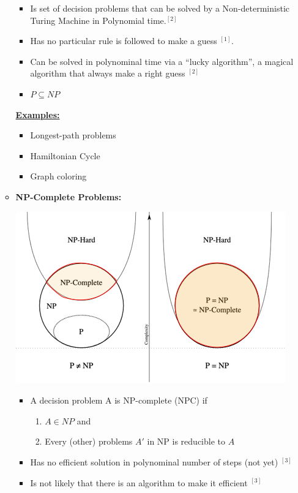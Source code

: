 \documentclass[12pt]{article}
\begin{document}
\begin{enumerate}[1.]
\begin{itemize}
        \begin{itemize}
            \item Is set of decision problems that can be solved by a Non-deterministic Turing Machine in Polynomial time.$^{[2]}$
            \item Has no particular rule is followed to make a guess $^{[1]}$.
            \item Can be solved in polynominal time via a ``lucky algorithm'', a magical algorithm that always make a right guess $^{[2]}$
            \item $P \subseteq NP$
        \end{itemize}

        \bigskip

        \underline{\textbf{Examples:}}

        \begin{itemize}
            \item Longest-path problems
            \item Hamiltonian Cycle
            \item Graph coloring
        \end{itemize}

        \bigskip

        \item \textbf{NP-Complete Problems:}

        \begin{center}
        \includegraphics[width=0.7\linewidth]{images/worksheet_7_solution_3.png}
        \end{center}

        \begin{itemize}
            \item A decision problem A is NP-complete (NPC) if

            \begin{enumerate}[1)]
                \item $A \in NP$ and
                \item Every (other) problems $A'$ in NP is reducible to $A$
            \end{enumerate}
            \item Has no efficient solution in polynominal number of steps (not yet) $^{[3]}$
            \item Is not likely that there is an algorithm to make it efficient $^{[3]}$
        \end{itemize}


\end{itemize}
\end{enumerate}
\end{document}
